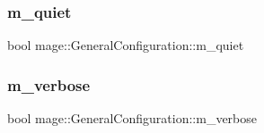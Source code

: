 \subsubsection{\texorpdfstring{m\+\_\+quiet}{m\_quiet}}
{\footnotesize\ttfamily bool mage\+::\+General\+Configuration\+::m\+\_\+quiet}

\hypertarget{structmage_1_1_general_configuration_aacc88850ee46834ab0ee52bbfa8a3a80}{}\label{structmage_1_1_general_configuration_aacc88850ee46834ab0ee52bbfa8a3a80} 
\subsubsection{\texorpdfstring{m\+\_\+verbose}{m\_verbose}}
{\footnotesize\ttfamily bool mage\+::\+General\+Configuration\+::m\+\_\+verbose}

